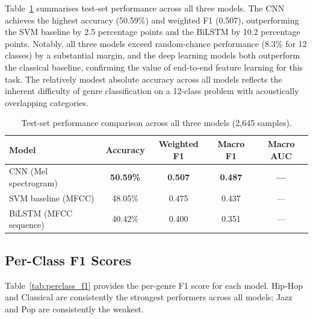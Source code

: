 \documentclass[12pt, a4paper]{article}
\begin{document}
Table~\ref{tab:overall_results} summarises test-set performance across all three models.
The CNN achieves the highest accuracy (50.59\%) and weighted F1 (0.507), outperforming
the SVM baseline by 2.5 percentage points and the BiLSTM by 10.2 percentage points.
Notably, all three models exceed random-chance performance (8.3\% for 12 classes) by a
substantial margin, and the deep learning models both outperform the classical baseline,
confirming the value of end-to-end feature learning for this task. The relatively modest
absolute accuracy across all models reflects the inherent difficulty of genre
classification on a 12-class problem with acoustically overlapping categories.

\begin{table}[h!]
    \centering
    \caption{Test-set performance comparison across all three models (2{,}645 samples).}
    \label{tab:overall_results}
    \begin{tabular}{lcccc}
        \toprule
        \textbf{Model} & \textbf{Accuracy} & \textbf{Weighted F1} & \textbf{Macro F1} & \textbf{Macro AUC} \\
        \midrule
        CNN (Mel spectrogram)   & \textbf{50.59\%} & \textbf{0.507} & \textbf{0.487} & \textbf{---} \\
        SVM baseline (MFCC)     & 48.05\%          & 0.475          & 0.437          & ---           \\
        BiLSTM (MFCC sequence)  & 40.42\%          & 0.400          & 0.351          & ---           \\
        \bottomrule
    \end{tabular}
\end{table}

\subsection{Per-Class F1 Scores}

Table~\ref{tab:perclass_f1} provides the per-genre F1 score for each model. Hip-Hop
and Classical are consistently the strongest performers across all models; Jazz and Pop
are consistently the weakest.
\end{document}
